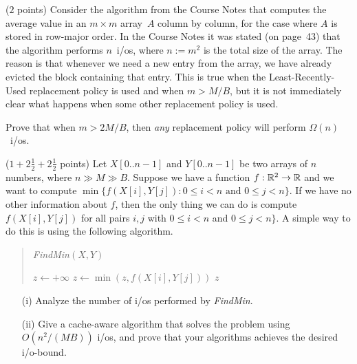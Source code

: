 \documentclass{article}
\newcommand{\Reals}{{\Bbb R}}
\renewcommand{\leq}{\leqslant}
\newcommand{\io}{{\sc i/o}\xspace}
\newcommand{\ios}{{\io}s\xspace}
\newcounter{rcounter}
\newenvironment{rlist}%
{\begin{list}{\setnr-\arabic{rcounter}}{\usecounter{rcounter}}}{\end{list}}
\begin{document}
\begin{rlist}
        \item ($2$ points)
        Consider the algorithm from the Course Notes that computes the average value in an $m\times m$ array~$A$ column by column, for the case where $A$ is stored in row-major order. In the Course Notes it was stated (on page~43) that the algorithm performs $n$~\ios, where $n := m^2$ is the total size of the array. The reason is that whenever we need a new entry from the array, we have already evicted the block containing that entry. This is true when the Least-Recently-Used replacement policy is used and when $m > M/B$, but it is not immediately clear what happens when some other replacement policy is used.
        
        Prove that when $m>2M/B$, then \emph{any} replacement policy will perform $\Omega(n)$~\ios.
        
        
        \item ($1+2\frac{1}{2}+2\frac{1}{2}$ points)
        Let $X[0..n-1]$ and $Y[0..n-1]$ be two arrays of $n$ numbers, where $n \gg M \gg B$. Suppose we have a function $f:\Reals^2\rightarrow \Reals$ and we want to compute $\min \{ f(X[i],Y[j]) : 0\leq i <n \mbox{ and } 0\leq j <n \}$. If we have no other information about $f$, then the only thing we can do is compute $f(X[i],Y[j])$ for all pairs $i,j$ with $0\leq i <n$ and $0\leq j <n \}$. A simple way to do this is using the following algorithm.
        \begin{quotation}
            \noindent
            \emph{FindMin}$(X,Y)$ \\[-5mm]
            \begin{algorithmic}[1]
                \State $z \gets +\infty$
                \State $z \gets \min ( z, f(X[i],Y[j]) )$
                \EndFor
                \EndFor
                \State \Return $z$
            \end{algorithmic}
        \end{quotation}
        \begin{enumerate}
            \item[(i)]
            Analyze the number of \ios performed by \emph{FindMin}.
            \item[(ii)]
            Give a cache-aware algorithm that solves the problem using $O(n^2/(MB))$ \ios, and prove that your algorithms achieves the desired \io-bound.
            

\end{enumerate}
\end{rlist}
\end{document}
